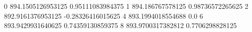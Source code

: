 0 894.1505126953125 0.95111083984375
1 894.186767578125 0.98736572265625
2 892.9161376953125 -0.28326416015625
4 893.1994018554688 0.0
6 893.9429931640625 0.74359130859375
8 893.9700317382812 0.7706298828125
